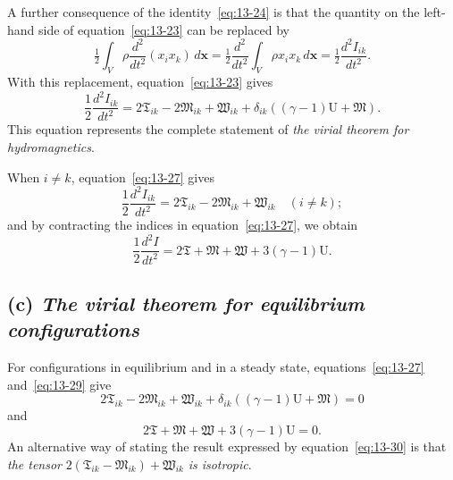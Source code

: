 A further consequence of the identity~\eqref{eq:13-24} is that the quantity on the left-hand side of equation~\eqref{eq:13-23} can be replaced by
\begin{equation}
\label{eq:13-26}
\tfrac{1}{2}\int_V \rho \frac{d^2}{dt^2}(x_i x_k)\,d\mathbf{x} = \tfrac{1}{2}\frac{d^2}{dt^2}\int_V \rho x_i x_k\,d\mathbf{x} = \tfrac{1}{2}\frac{d^2 I_{ik}}{dt^2}.
\end{equation}
With this replacement, equation~\eqref{eq:13-23} gives
\begin{equation}
\label{eq:13-27}
\frac{1}{2}\frac{d^2 I_{ik}}{dt^2} = 2\mathfrak{T}_{ik} - 2\mathfrak{M}_{ik} + \mathfrak{W}_{ik} + \delta_{ik}((\gamma-1)\mathrm{U}+\mathfrak{M}).
\end{equation}
This equation represents the complete statement of \textit{the virial theorem for hydromagnetics}.

When $i \neq k$, equation~\eqref{eq:13-27} gives
\begin{equation}
\label{eq:13-28}
\frac{1}{2}\frac{d^2 I_{ik}}{dt^2} = 2\mathfrak{T}_{ik} - 2\mathfrak{M}_{ik} + \mathfrak{W}_{ik} \quad (i \neq k);
\end{equation}
and by contracting the indices in equation~\eqref{eq:13-27}, we obtain
\begin{equation}
\label{eq:13-29}
\frac{1}{2}\frac{d^2 I}{dt^2} = 2\mathfrak{T}+\mathfrak{M}+\mathfrak{W}+3(\gamma-1)\mathrm{U}.
\end{equation}

\subsection*{(c) \textit{The virial theorem for equilibrium configurations}}

For configurations in equilibrium and in a steady state, equations~\eqref{eq:13-27} and~\eqref{eq:13-29} give
\begin{equation}
\label{eq:13-30}
2\mathfrak{T}_{ik} - 2\mathfrak{M}_{ik} + \mathfrak{W}_{ik} + \delta_{ik}((\gamma-1)\mathrm{U}+\mathfrak{M}) = 0
\end{equation}
and
\begin{equation}
\label{eq:13-31}
2\mathfrak{T}+\mathfrak{M}+\mathfrak{W}+3(\gamma-1)\mathrm{U} = 0.
\end{equation}
An alternative way of stating the result expressed by equation~\eqref{eq:13-30} is that \textit{the tensor} $2(\mathfrak{T}_{ik}-\mathfrak{M}_{ik})+\mathfrak{W}_{ik}$ \textit{is isotropic}.

